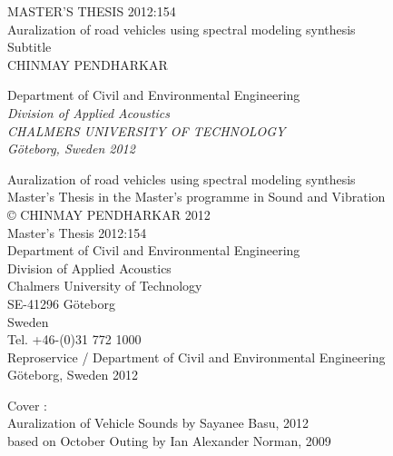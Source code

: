 \begin{titlepage}
\begin{center}

MASTER'S THESIS 2012:154\\
\vspace{5cm} 
\huge{Auralization of road vehicles using spectral modeling synthesis}\\ 
\vspace{0.5cm} 
\huge{Subtitle}\\
\vspace{1cm} 
\LARGE{CHINMAY PENDHARKAR}

\vspace{10cm}
\enlargethispage{2cm}
\normalsize{
Department of Civil and Environmental Engineering\\}
\textit{Division of Applied Acoustics\\
CHALMERS UNIVERSITY OF TECHNOLOGY\\
G\"oteborg, Sweden 2012}

\end{center}
\end{titlepage}


\thispagestyle{empty}

\noindent
Auralization of road vehicles using spectral modeling synthesis\\
Master's Thesis in the Master's programme in Sound and Vibration\\

\vspace{1ex}
\noindent
\copyright \hspace{1ex} CHINMAY PENDHARKAR 2012
\vspace{3cm}\\
Master's Thesis 2012:154
\vspace{\baselineskip}\\
Department of Civil and Environmental Engineering\\
Division of Applied Acoustics\\
Chalmers University of Technology\\
SE-41296 G\"oteborg\\
Sweden
\vspace{\baselineskip}\\
Tel.	+46-(0)31 772 1000
\enlargethispage{2cm}
\vspace{11.5cm}\\
Reproservice / Department of Civil and Environmental Engineering\\
G\"oteborg, Sweden 2012

\clearpage


Cover :  \\
Auralization of Vehicle Sounds by Sayanee Basu, 2012 \\
based on October Outing by Ian Alexander Norman, 2009

